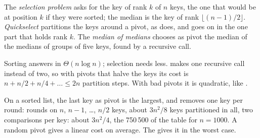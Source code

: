 \begin{definition}\label{def:b1:divide-and-conquer:selection}
The \emph{selection problem} asks for the key of rank $k$ of $n$ keys, the one that would be
at position $k$ if they were sorted; the median is the key of rank $\lfloor (n - 1)/2 \rfloor$. \emph{Quickselect}
 partitions the keys around a pivot, as  does, and goes on in the one part that holds rank
$k$. The \emph{median of medians} chooses as pivot the median of the medians of groups of five
keys, found by a recursive call.
\end{definition}

Sorting answers in $\Theta(n \log n)$; selection needs less.  makes one recursive call instead of two, so
with pivots that halve the keys its cost is $n + n/2 + n/4 + \dots \leq 2n$ partition steps. With bad pivots it is
quadratic, like .

\label{lst:b1:divide-and-conquer:select}

\label{out:b1:divide-and-conquer:select}

On a sorted list, the last key as pivot is the largest, and  removes one key per round: rounds on $n$,
$n - 1$, \dots, $n/2$ keys, about $3n^2/8$ keys partitioned in all, two comparisons per key: about $3n^2/4$, the 750\,500 of the
table for $n = 1000$. A random pivot gives a linear cost on average. The  gives it in the worst case.

